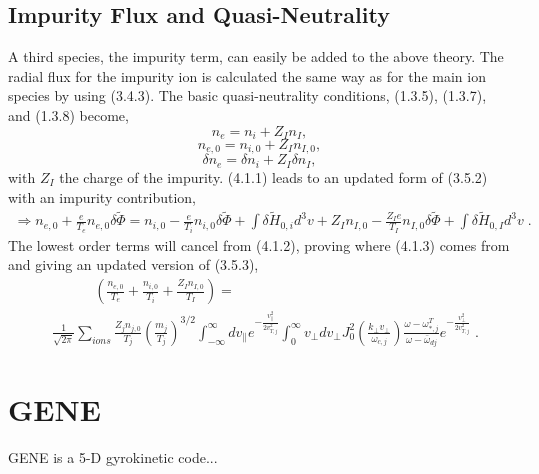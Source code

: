 \documentclass[12pt]{article}
\numberwithin{equation}{subsection}
\begin{document}
\subsection{Impurity Flux and Quasi-Neutrality}
   \quad A third species, the impurity term, can easily be added to the above theory. The radial flux for the impurity ion is calculated the same way as for
the main ion species by using (3.4.3). The basic quasi-neutrality conditions, (1.3.5), (1.3.7), and (1.3.8) become,
   \begin{equation}
      n_e = n_i + Z_In_I,
   \end{equation}
   \begin{equation}
      n_{e,0} = n_{i,0} + Z_In_{I,0},
   \end{equation}
   \begin{equation}
      \delta n_e = \delta n_i + Z_I\delta n_I,
   \end{equation}
with $Z_I$ the charge of the impurity. (4.1.1) leads to an updated form of (3.5.2) with an impurity contribution,
   \begin{equation}
   \begin{aligned}
      \Rightarrow n_{e,0} + \frac{e}{T_e}n_{e,0}\delta\widetilde{\Phi} = n_{i,0} - \frac{e}{T_i}n_{i,0}\delta\widetilde{\Phi} + \int\delta\widetilde{H}_{0,i}d^3v
                + Z_In_{I,0} - \frac{Z_Ie}{T_I}n_{I,0}\delta\widetilde{\Phi} + \int\delta\widetilde{H}_{0,I}d^3v\;.
   \end{aligned}
   \end{equation}
The lowest order terms will cancel from (4.1.2), proving where (4.1.3) comes from and giving an updated version of (3.5.3),
   \begin{equation}
   \begin{aligned}
      &\quad\quad\quad(\frac{n_{e,0}}{T_e} + \frac{n_{i,0}}{T_i} + \frac{Z_I n_{I,0}}{T_I}) = \\
      &\frac{1}{\sqrt{2\pi}}\sum\limits_{ions}\frac{Z_jn_{j,0}}{T_j}\left(\frac{m_j}{T_j}\right)^{3/2}
      \int_{-\infty}^{\infty}dv_\parallel e^{-\frac{v_\parallel^2}{2v^2_{T,j}}}
      \int_{0}^{\infty}v_\perp dv_\perp J_0^2(\frac{k_\perp v_\perp}{\omega_{c,j}})
      \frac{\omega - \omega_{*,j}^T}{\omega - \bar{\omega}_{dj}}e^{-\frac{v_\perp^2}{2v_{T,j}^2}}\;.
   \end{aligned}
   \end{equation}


\section{GENE}
   \quad GENE is a 5-D gyrokinetic code\cite{GENE}...
\end{document}
